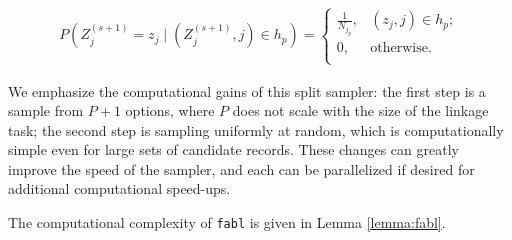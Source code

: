 \documentclass[ba]{imsart}
\begin{document}
\begin{align}
		\label{eqn:gibbs2}
		P\left(Z_j^{(s+1)} = z_j \mid \left(Z_j^{(s+1)}, j\right) \in h_p \right) = \begin{cases} 
			\frac{1}{N_{j_p}}, & (z_j, j) \in h_p; \\
			0, & \text{otherwise.} \\
		\end{cases}
	\end{align} 
	
We emphasize the computational gains of this split sampler: the first step is a sample from $P + 1$ options, where $P$ does not scale with the size of the linkage task; the second step is sampling uniformly at random, which is computationally simple even for large sets of candidate records. These changes can greatly improve the speed of the sampler, and each can be parallelized if desired for additional computational speed-ups.  

The computational complexity of \texttt{fabl} is given in Lemma \ref{lemma:fabl}.

	
	
	
\end{document}
